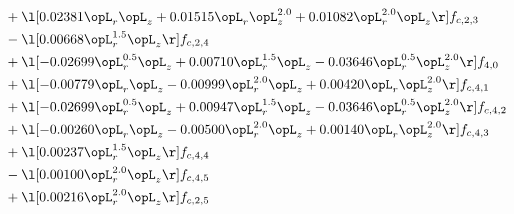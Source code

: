 \begin{alignat}{2}
& + \l[  0.02381 \opL_r \opL_z +  0.01515 \opL_r \opL_z^{2.0} +  0.01082 \opL_r^{2.0} \opL_z  \r] f_{c,2,3} \nonumber \\ 
& - \l[  0.00668 \opL_r^{1.5} \opL_z  \r] f_{c,2,4} \nonumber \\ 
& + \l[  -0.02699 \opL_r^{0.5} \opL_z +  0.00710 \opL_r^{1.5} \opL_z   -0.03646 \opL_r^{0.5} \opL_z^{2.0}  \r] f_{4,0} \nonumber \\ 
& + \l[  -0.00779 \opL_r \opL_z   -0.00999 \opL_r^{2.0} \opL_z +  0.00420 \opL_r \opL_z^{2.0}  \r] f_{c,4,1} \nonumber \\ 
& + \l[  -0.02699 \opL_r^{0.5} \opL_z +  0.00947 \opL_r^{1.5} \opL_z   -0.03646 \opL_r^{0.5} \opL_z^{2.0}  \r] f_{c,4,2} \nonumber \\ 
& + \l[  -0.00260 \opL_r \opL_z   -0.00500 \opL_r^{2.0} \opL_z +  0.00140 \opL_r \opL_z^{2.0}  \r] f_{c,4,3} \nonumber \\ 
& + \l[  0.00237 \opL_r^{1.5} \opL_z  \r] f_{c,4,4} \nonumber \\ 
& - \l[  0.00100 \opL_r^{2.0} \opL_z  \r] f_{c,4,5} \nonumber \\ 
& + \l[  0.00216 \opL_r^{2.0} \opL_z  \r] f_{c,2,5} \nonumber \\ 
\end{alignat} 


